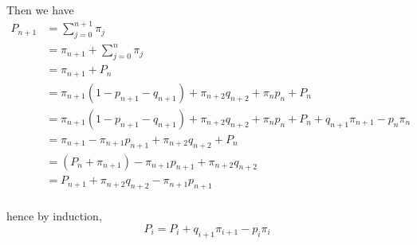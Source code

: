 \documentclass{article}
\begin{document}
Then we have
\begin{align*}
    P_{n+1} &= \sum_{j=0}^{n+1}\pi_j\\
    &=\pi_{n+1}+\sum_{j=0}^{n}\pi_j\\
    &= \pi_{n+1} + P_n\\
    &= \pi_{n+1}(1-p_{n+1} - q_{n+1}) + \pi_{n+2}q_{n+2} + \pi_{n}p_n + P_n\\
    &= \pi_{n+1}(1-p_{n+1} - q_{n+1}) + \pi_{n+2}q_{n+2} + \pi_{n}p_n + P_n + q_{n+1}\pi_{n+1}-p_n\pi_n\\
    &= \pi_{n+1}-\pi_{n+1}p_{n+1} + \pi_{n+2}q_{n+2} + P_n\\
    &=(P_n+\pi_{n+1})-\pi_{n+1}p_{n+1} + \pi_{n+2}q_{n+2}\\
    &=P_{n+1} + \pi_{n+2}q_{n+2}-\pi_{n+1}p_{n+1}\\
\end{align*}

hence by induction, $$P_i = P_i + q_{i+1}\pi_{i+1}-p_i\pi_i$$
\end{document}
